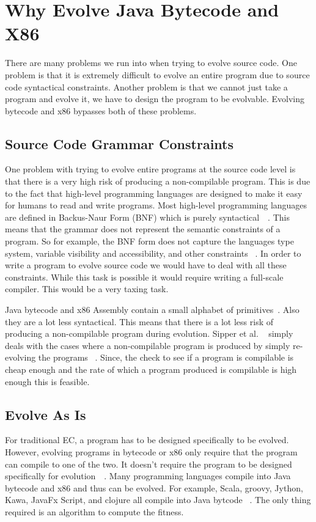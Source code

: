 \documentclass{sig-alternate}
\begin{document}
\section{Why Evolve Java Bytecode and X86}

There are many problems we run into when trying to evolve source code. One problem is that it is extremely difficult to evolve an entire program due to source code syntactical constraints. Another problem is that we cannot just take a program and evolve it, we have to design the program to be evolvable. Evolving bytecode and x86 bypasses both of these problems.


\subsection{Source Code Grammar Constraints}
One problem with trying to evolve entire programs at the source code level is that there is a very high risk of producing a non-compilable program. This is due to the fact that high-level programming languages are designed to make it easy for humans to read and write programs. Most high-level programming languages are defined in Backus-Naur Form (BNF) which is purely syntactical~\cite{BNF:2014}~\cite{FINCH:2010}. This means that the grammar does not represent the semantic constraints of a program. So for example, the BNF form does not capture the languages type system, variable visibility and accessibility, and other constraints ~\cite{FINCH:2010}. In order to write a program to evolve source code we would have to deal with all these constraints. While this task is possible it would require writing a full-scale compiler. This would be a very taxing task. \par

Java bytecode and x86 Assembly contain a small alphabet of primitives~\cite{Assembly:2010}. Also they are a lot less syntactical. This means that there is a lot less risk of producing a non-compilable program during evolution. Sipper et al. ~\cite{FINCH:2010} simply deals with the cases where a non-compilable program is produced by simply re-evolving the programs ~\cite{FINCH:2010}. Since, the check to see if a program is compilable is cheap enough and the rate of which a program produced is compilable is high enough this is feasible. 

\subsection{Evolve As Is}
For traditional EC, a program has to be designed specifically to be evolved. However, evolving programs in bytecode or x86 only require that the program can compile to one of the two. It doesn't require the program to be designed specifically for evolution~\cite{Assembly:2010}~\cite{FINCH:2010}. Many programming languages compile into Java bytecode and x86 and thus can be evolved. For example, Scala, groovy, Jython, Kawa, JavaFx Script, and clojure all compile into Java bytcode ~\cite{FINCH:2010}. The only thing required is an algorithm to compute the fitness. 
\end{document}
